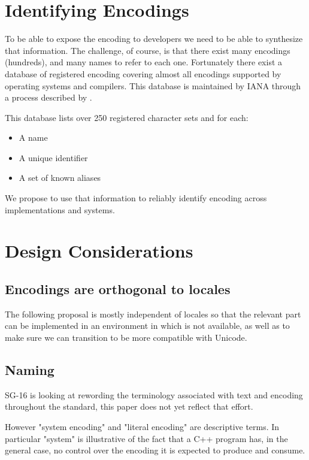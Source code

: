 \documentclass{wg21}
\begin{document}
\section{Identifying Encodings}

To be able to expose the encoding to developers we need to be able to synthesize that information.
The challenge, of course, is that there exist many encodings (hundreds), and many names to refer to each one.
Fortunately there exist a database of registered encoding covering almost all encodings supported by operating systems and compilers.
This database is maintained by IANA through a process described by \cite{rfc2978}.

This database lists over 250 registered character sets and for each:
\begin{itemize}
    \item A name
    \item A unique identifier
    \item A set of known aliases
\end{itemize}

We propose to use that information to reliably identify encoding across implementations and systems.


\section{Design Considerations}

\subsection{Encodings are orthogonal to locales}

The following proposal is mostly independent of locales so that the relevant part can be implemented in an environment in which 
is not available, as well as to make sure we can transition  to be more compatible with Unicode.

\subsection{Naming}
SG-16 is looking at rewording the terminology associated with text and encoding throughout the standard, this paper does not yet reflect that effort.

However "system encoding" and "literal encoding" are descriptive terms. In particular "system" is illustrative of the
fact that a C++ program has, in the general case, no control over the encoding it is expected to produce and consume.
\end{document}
